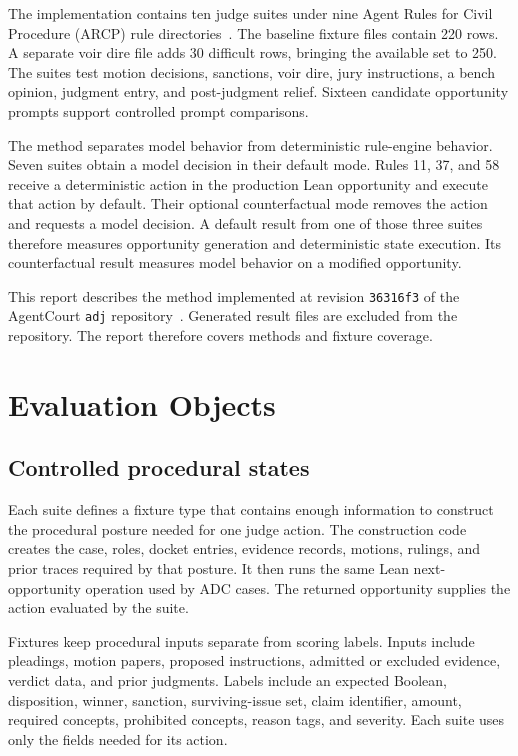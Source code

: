 \documentclass[11pt]{article}
\newcommand{\code}[1]{\texttt{#1}}
\begin{document}
The implementation contains ten judge suites under nine Agent Rules for Civil Procedure (ARCP) rule directories~\cite{evalassets,arcp}.  The baseline fixture files contain 220 rows.  A separate voir dire file adds 30 difficult rows, bringing the available set to 250.  The suites test motion decisions, sanctions, voir dire, jury instructions, a bench opinion, judgment entry, and post-judgment relief.  Sixteen candidate opportunity prompts support controlled prompt comparisons.

The method separates model behavior from deterministic rule-engine behavior.  Seven suites obtain a model decision in their default mode.  Rules 11, 37, and 58 receive a deterministic action in the production Lean opportunity and execute that action by default.  Their optional counterfactual mode removes the action and requests a model decision.  A default result from one of those three suites therefore measures opportunity generation and deterministic state execution.  Its counterfactual result measures model behavior on a modified opportunity.

This report describes the method implemented at revision \code{36316f3} of the AgentCourt \code{adj} repository~\cite{evalcode}.  Generated result files are excluded from the repository.  The report therefore covers methods and fixture coverage.

\section{Evaluation Objects}

\subsection{Controlled procedural states}

Each suite defines a fixture type that contains enough information to construct the procedural posture needed for one judge action.  The construction code creates the case, roles, docket entries, evidence records, motions, rulings, and prior traces required by that posture.  It then runs the same Lean next-opportunity operation used by ADC cases.  The returned opportunity supplies the action evaluated by the suite.

Fixtures keep procedural inputs separate from scoring labels.  Inputs include pleadings, motion papers, proposed instructions, admitted or excluded evidence, verdict data, and prior judgments.  Labels include an expected Boolean, disposition, winner, sanction, surviving-issue set, claim identifier, amount, required concepts, prohibited concepts, reason tags, and severity.  Each suite uses only the fields needed for its action.
\end{document}
